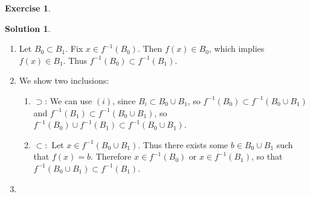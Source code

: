 \documentclass[12pt]{article}
\theoremstyle{plain}
\theoremstyle{definition}
\newtheorem*{solution}{\color{Goldenrod}Solution}
\newtheorem{exercise}{\color{YellowOrange}Exercise}[section]
\newcommand\inv[1]{#1^{-1}}
\def\ss{\subset}
\newcommand{\1}{\mathbbm 1}
\begin{document}
\begin{exercise}

\end{exercise}
\begin{solution}
\begin{enumerate}
	\item Let $B_0 \subset B_1$. Fix $x \in \inv{f}(B_0)$. Then $f(x) \in B_0$, which implies $f(x) \in B_1$. Thus $\inv{f}(B_0) \ss \inv{f}(B_1)$. 
	\item We show two inclusions:
	\begin{enumerate}
	 	\item $\supset$: We can use $(i)$, since $B_i \subset B_0 \cup B_1$, so $\inv{f}(B_0) \ss \inv{f}(B_0 \cup B_1)$ and $\inv{f}(B_1) \ss \inv{f}(B_0 \cup B_1)$, so $\inv{f}(B_0) \cup \inv{f}(B_1) \ss \inv{f}(B_0 \cup B_1)$.
	 	\item $\ss:$ Let $x \in \inv{f}(B_0 \cup B_1)$. Thus there exists some $b \in B_0 \cup B_1$ such that $f(x) = b$. Therefore $x \in \inv{f}(B_0)$ or $x \in \inv{f}(B_1)$, so that $\inv{f}(B_0 \cup B_1) \ss \inv{f}(B_1)$.
	 \end{enumerate}
	 \item  
\end{enumerate}
\end{solution}
\end{document}
